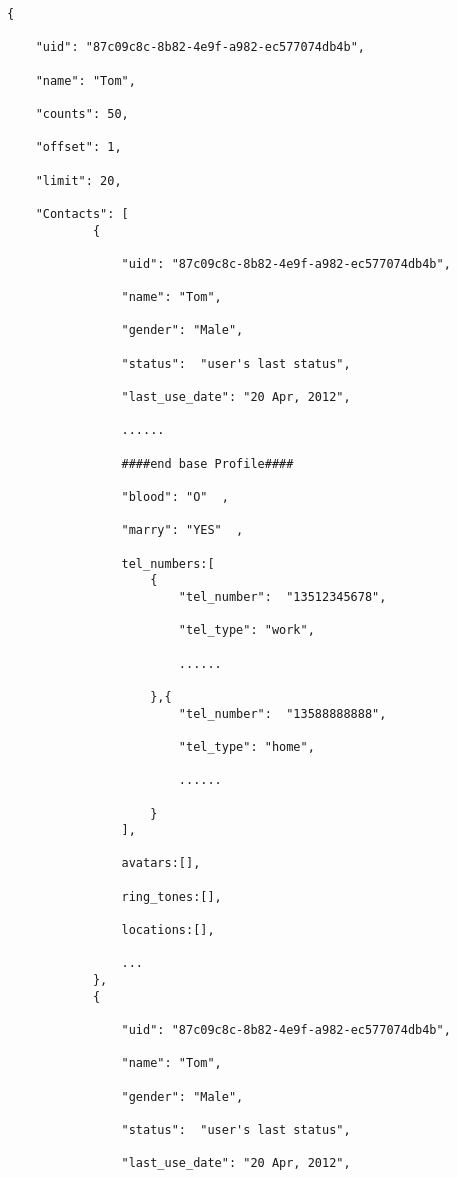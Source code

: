 \begin{verbatim}
{

    "uid": "87c09c8c-8b82-4e9f-a982-ec577074db4b",

    "name": "Tom",  

    "counts": 50,  

    "offset": 1,  

    "limit": 20,  

    "Contacts": [
            {

                "uid": "87c09c8c-8b82-4e9f-a982-ec577074db4b",

                "name": "Tom",

                "gender": "Male",

                "status":  "user's last status",

                "last_use_date": "20 Apr, 2012",

                ......

                ####end base Profile####

                "blood": "O"  ,

                "marry": "YES"  ,

                tel_numbers:[
                    {
                        "tel_number":  "13512345678",

                        "tel_type": "work",

                        ......

                    },{
                        "tel_number":  "13588888888",

                        "tel_type": "home",

                        ......

                    }
                ],

                avatars:[],

                ring_tones:[],

                locations:[],

                ...
            },
            {

                "uid": "87c09c8c-8b82-4e9f-a982-ec577074db4b",

                "name": "Tom",

                "gender": "Male",

                "status":  "user's last status",

                "last_use_date": "20 Apr, 2012",


\end{verbatim}
